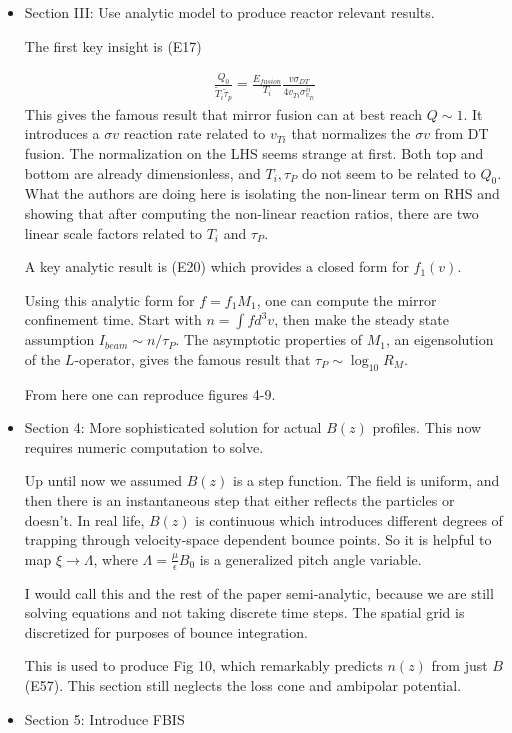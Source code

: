 \documentclass{article}
\numberwithin{equation}{section}
\newcommand\eq[1]{
    \begin{equation}
        \begin{split} #1 \end{split}
    \end{equation} }
\begin{document}
\begin{itemize}
	\item Section III: Use analytic model to produce reactor relevant results.
	
	The first key insight is (E17)
	\eq{
		\frac{Q_0}{\tilde T_i \tilde \tau_p}
		= \frac{E_{fusion}}{T_i}
		\frac{v\sigma_{DT}}{4 v_{Ti} \sigma^{ii}_{v_{Ti}}}
	}
	This gives the famous result that mirror fusion can at best reach $Q \sim 1$. It introduces a $\sigma v$ reaction rate related to $v_{Ti}$ that normalizes the $\sigma v$ from DT fusion. The normalization on the LHS seems strange at first. Both top and bottom are already dimensionless, and $T_i, \tau_P$ do not seem to be related to $Q_0$. What the authors are doing here is isolating the non-linear term on RHS and showing that after computing the non-linear reaction ratios, there are two linear scale factors related to $T_i$ and $\tau_P$.
	
	A key analytic result is (E20) which provides a closed form for $f_1(v)$.

	Using this analytic form for $f = f_1 M_1$, one can compute the mirror confinement time. Start with $n = \int f d^3 v$, then make the steady state assumption $I_{beam} \sim n/\tau_P$. The asymptotic properties of $M_1$, an eigensolution of the $L$-operator, gives the famous result that $\tau_{P} \sim \log_{10} R_M$.

	From here one can reproduce figures 4-9.

	\item Section 4: More sophisticated solution for actual $B(z)$ profiles. This now requires numeric computation to solve. 
	
	Up until now we assumed $B(z)$ is a step function. The field is uniform, and then there is an instantaneous step that either reflects the particles or doesn't. In real life, $B(z)$ is continuous which introduces different degrees of trapping through velocity-space dependent bounce points. So it is helpful to map $\xi \to \Lambda$, where $\Lambda = \frac{\mu}{\epsilon} B_0$ is a generalized pitch angle variable.

	I would call this and the rest of the paper semi-analytic, because we are still solving equations and not taking discrete time steps. The spatial grid is discretized for purposes of bounce integration.

	This is used to produce Fig 10, which remarkably predicts $n(z)$ from just $B$ (E57).
	This section still neglects the loss cone and ambipolar potential.

	\item Section 5: Introduce FBIS
	

\end{itemize}
\end{document}
